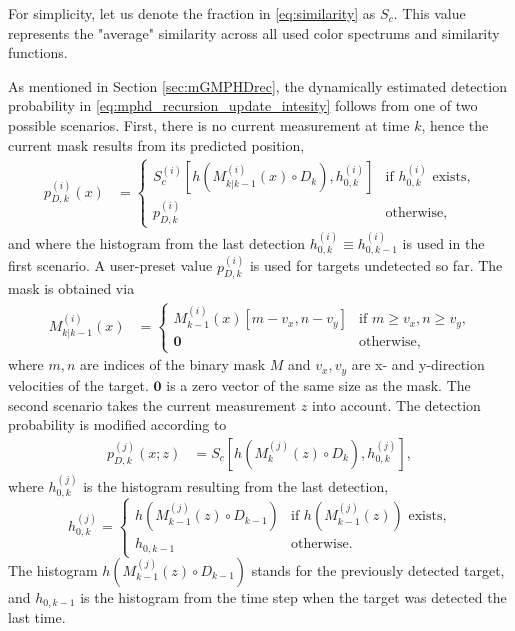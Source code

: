For simplicity, let us denote the fraction in \eqref{eq:similarity} as $S_c$. This value represents the "average"
similarity across all used color spectrums and similarity functions.

As mentioned in Section \ref{sec:mGMPHDrec}, the dynamically estimated detection probability in \eqref{eq:mphd_recursion_update_intesity} follows from one of two possible scenarios. First, there is no current measurement at
time $k$, hence the current mask results from its predicted position,
\begin{align}
  \label{eq:mphd_recursion_update_intesity_misdetect_pd}
  p_{D,k}^{(i)}(x) &=
  \begin{cases}
     S_c^{(i)}\left[h(M_{k|k-1}^{(i)}(x) \circ D_k), h_{0,k}^{(i)}\right] &\text{if $h_{0,k}^{(i)}$ exists,} \\
     p_{D,k}^{(i)} \quad& \text{otherwise,}
  \end{cases}
\end{align}
and where the histogram from the last detection $h_{0,k}^{(i)} \equiv  h_{0,k-1}^{(i)}$ is used in the first scenario. A user-preset value $p_{D,k}^{(i)}$ is used for targets undetected so far. The mask is obtained via
\begin{align}
  \label{eq:mphd_recursion_update_intesity_misdetect_M_shifted}
  M_{k|k-1}^{(i)}(x) &=
  \begin{cases}
    \!M_{k-1}^{(i)}(x)[m-v_x, n-v_y] &\text{if $m\geq v_x, n\geq v_y$,} \\
    \mathbf{0} \quad &\text{otherwise,}
  \end{cases}
\end{align}
where $m, n$ are indices of the binary mask $M$ and $v_x, v_y$ are x- and y-direction velocities of the target. $\mathbf{0}$ is a zero vector of the same size as the mask. The second scenario takes the current measurement $z$ into account. The detection probability is modified according to
\begin{align}
  p_{D,k}^{(j)}(x;z) &= S_c\left[h(M_{k}^{(j)}(z) \circ D_k), h_{0,k}^{(j)}\right],
\end{align}
where $h_{0,k}^{(j)}$ is the histogram resulting from the last detection,
\begin{equation}
  \label{eq:mphd_recursion_update_intesity_misdetect_Hist}
  h_{0,k}^{(j)} =
  \begin{cases}
    h(M_{k-1}^{(j)}(z) \circ D_{k-1}) &\text{if } h(M_{k-1}^{(j)}(z)) \text{ exists,} \\
    h_{0,k-1} &\text{otherwise.}
  \end{cases}
\end{equation}
The histogram $h(M_{k-1}^{(j)}(z) \circ D_{k-1})$ stands for the previously detected target, and $h_{0,k-1}$ is the histogram from the time step when the target was detected the last time.



